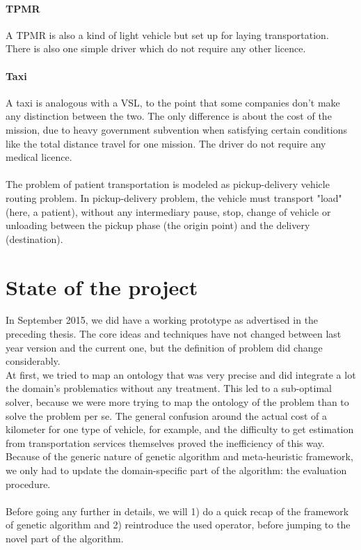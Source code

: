 \documentclass[12pt]{memoir}
\begin{document}
  \paragraph{TPMR} %
\label{par:TPMR}
A TPMR is also a kind of light vehicle but set up for laying transportation. There is
also one simple driver which do not require any other licence. 

  \paragraph{Taxi} %
\label{par:Taxi}
A taxi is analogous with a VSL, to the point that some companies don't make any
distinction between the two. The only difference is about the cost of the mission,
due to heavy government subvention when satisfying certain conditions like the total
distance travel for one mission. The driver do not require any medical licence.\\
\\
The problem of patient transportation is modeled as pickup-delivery vehicle routing
problem. In pickup-delivery problem, the vehicle must transport "load" (here, a
patient), without any intermediary pause, stop, change of vehicle or unloading
between the pickup phase (the origin point) and the delivery (destination).

\section{State of the project}
In September 2015, we did have a working prototype as advertised in the preceding
thesis. The core ideas and techniques have not changed between last year version
and the current one, but the definition of problem did change considerably. \\
At first, we tried to map an ontology that was very precise and did integrate a lot
the domain's problematics without any treatment. This led to a sub-optimal solver,
because we were more trying to map the ontology of the problem than to solve the
problem per se. The general confusion around the actual cost of a kilometer for
one type of vehicle, for example, and the difficulty to get estimation from transportation services
themselves proved the inefficiency of this way.\\
Because of the generic nature of genetic algorithm and meta-heuristic framework, we only
had to update the domain-specific part of the algorithm: the evaluation procedure.\\
\\
Before going any further in details, we will 1) do a quick recap of the framework
of genetic algorithm and 2) reintroduce the used operator, before jumping to the
novel part of the algorithm.
\end{document}
